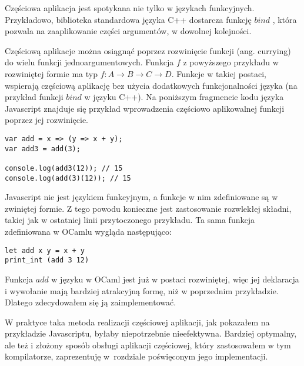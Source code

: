 \documentclass[declaration,shortabstract]{iithesis}
\begin{document}
Częściowa aplikacja jest spotykana nie tylko w językach funkcyjnych. 
Przykładowo, biblioteka standardowa języka C++ dostarcza funkcję
$bind$ \cite{cpp_bind}, która pozwala na zaaplikowanie części argumentów,
w dowolnej kolejności. 

Częściową aplikacje można osiągnąć poprzez rozwinięcie funkcji (ang. currying) 
do wielu funkcji jednoargumentowych. Funkcja $f$ z powyższego przykładu 
w rozwiniętej
formie ma typ $f : A \rightarrow B \rightarrow C \rightarrow D$. Funkcje w 
takiej postaci, wspierają częściową aplikację bez użycia dodatkowych 
funkcjonalności języka (na przykład funkcji $bind$ w języku C++).
Na poniższym fragmencie kodu języka 
Javascript znajduje się przykład wprowadzenia częściowo aplikowalnej funkcji 
poprzez jej rozwinięcie.


\begin{lstlisting}[frame=single, caption=Rozwinięcie funkcji w Javascriptcie.]
var add = x => (y => x + y);
var add3 = add(3);

console.log(add3(12)); // 15
console.log(add(3)(12)); // 15
\end{lstlisting}

Javascript nie jest językiem funkcyjnym, a funkcje w nim zdefiniowane są w 
zwiniętej formie. Z tego powodu konieczne jest zastosowanie rozwlekłej składni,
takiej jak w ostatniej linii przytoczonego przykładu. Ta sama funkcja 
zdefiniowana w OCamlu wygląda następująco:

\begin{lstlisting}[frame=single, caption=Rozwinięta funkcja w OCamlu.]
let add x y = x + y 
print_int (add 3 12)
\end{lstlisting}

Funkcja $add$ w języku w OCaml jest już w postaci rozwiniętej, więc jej 
deklaracja i wywołanie mają bardziej atrakcyjną formę, niż w poprzednim 
przykładzie. Dlatego zdecydowałem się ją zaimplementować.

W praktyce taka metoda realizacji częściowej aplikacji, jak pokazałem na 
przykładzie Javascriptu, byłaby niepotrzebnie nieefektywna. Bardziej optymalny,
ale też i złożony sposób obsługi aplikacji częściowej, który zastosowałem w tym 
kompilatorze, zaprezentuję w~rozdziale poświęconym jego implementacji.

\end{document}
